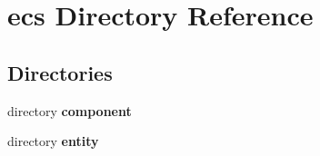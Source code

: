 \section{ecs Directory Reference}
\label{dir_eafb92770fbc727220bdaa0b1292f771}
\subsection*{Directories}
\begin{DoxyCompactItemize}
\item 
directory \textbf{ component}
\item 
directory \textbf{ entity}
\end{DoxyCompactItemize}
